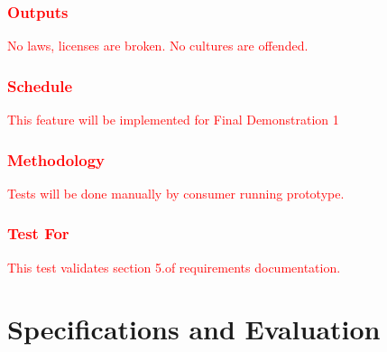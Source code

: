\documentclass[11pt, oneside]{article}   	%
\begin{document}
\subsubsection{\textcolor{red}{Outputs}}
\textcolor{red}{No laws, licenses are broken. No cultures are offended.}
\subsubsection{\textcolor{red}{Schedule}}
\textcolor{red}{This feature will be implemented for Final Demonstration 1}
\subsubsection{\textcolor{red}{Methodology}}
\textcolor{red}{Tests will be done manually by consumer running prototype.}
\subsubsection{\textcolor{red}{Test For}}
\textcolor{red}{This test validates section 5.of requirements documentation.}


\newpage
\section{Specifications and Evaluation}
\end{document}
